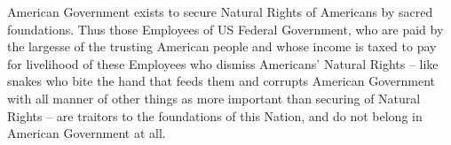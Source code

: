 \documentclass{amsart}
\begin{document}
American Government exists to secure Natural Rights of Americans by sacred foundations.  Thus those Employees of US Federal Government, who are paid by the largesse of the trusting American people and whose income is taxed to pay for livelihood of these Employees who dismiss Americans' Natural Rights -- like snakes who bite the hand that feeds them and corrupts American Government with all manner of other things as more important than securing of Natural Rights -- are traitors to the foundations of this Nation, and do not belong in American Government at all.  


\begin{thebibliography}{CCCC}
\end{thebibliography}
\end{document}
